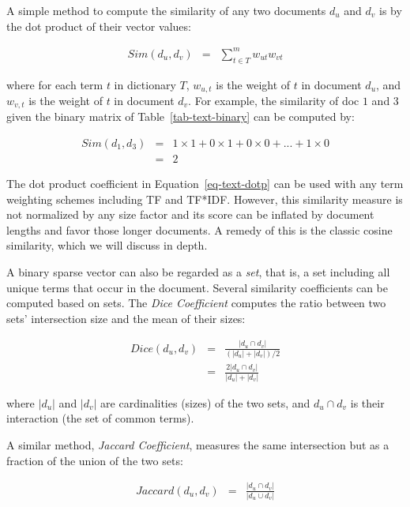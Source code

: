 \documentclass[
  letterpaper,
]{scrbook}
\begin{document}
A simple method to compute the similarity of any two documents \(d_u\)
and \(d_v\) is by the dot product of their vector values:

\[\begin{aligned}
Sim(d_u, d_v) & = & \sum_{t \in T}^{m} w_{ut} w_{vt}
\end{aligned}\]

where for each term \(t\) in dictionary \(T\), \(w_{u,t}\) is the weight
of \(t\) in document \(d_u\), and \(w_{v,t}\) is the weight of \(t\) in
document \(d_v\). For example, the similarity of doc \(1\) and \(3\)
given the binary matrix of
Table~\hyperref[tab-text-binary]{{[}tab-text-binary{]}} can be computed
by:

\[\begin{aligned}
Sim(d_1, d_3)
& = & 1\times1 + 0\times1 + 0\times0 + ... + 1\times0 \\
& = & 2
\end{aligned}\]

The dot product coefficient in
Equation~\hyperref[eq-text-dotp]{{[}eq-text-dotp{]}} can be used with
any term weighting schemes including TF and TF*IDF. However, this
similarity measure is not normalized by any size factor and its score
can be inflated by document lengths and favor those longer documents. A
remedy of this is the classic cosine similarity, which we will discuss
in depth.

A binary sparse vector can also be regarded as a \emph{set}, that is, a
set including all unique terms that occur in the document. Several
similarity coefficients can be computed based on sets. The \emph{Dice
Coefficient} computes the ratio between two sets' intersection size and
the mean of their sizes:

\[\begin{aligned}
Dice(d_u, d_v)
& = & \frac{|d_u \cap d_v|}{(|d_u| + |d_v|)/2}  \\
& = & \frac{2|d_u \cap d_v|}{|d_u| + |d_v|}
\end{aligned}\]

where \(|d_u|\) and \(|d_v|\) are cardinalities (sizes) of the two sets,
and \(d_u \cap d_v\) is their interaction (the set of common terms).

A similar method, \emph{Jaccard Coefficient}, measures the same
intersection but as a fraction of the union of the two sets:

\[\begin{aligned}
Jaccard(d_u, d_v) & = & \frac{|d_u \cap d_v|}{|d_u \cup d_v|}
\end{aligned}\]
\end{document}

